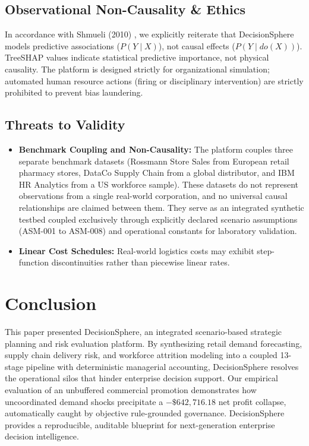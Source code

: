 \documentclass[conference]{IEEEtran}
\begin{document}
\subsection{Observational Non-Causality & Ethics}
In accordance with Shmueli (2010) \cite{shmueli2010explain}, we explicitly reiterate that DecisionSphere models predictive associations ($P(Y \mid X)$), not causal effects ($P(Y \mid do(X))$). TreeSHAP values indicate statistical predictive importance, not physical causality. The platform is designed strictly for organizational simulation; automated human resource actions (firing or disciplinary intervention) are strictly prohibited to prevent bias laundering.

\subsection{Threats to Validity}
\begin{itemize}
    \item \textbf{Benchmark Coupling and Non-Causality:} The platform couples three separate benchmark datasets (Rossmann Store Sales from European retail pharmacy stores, DataCo Supply Chain from a global distributor, and IBM HR Analytics from a US workforce sample). These datasets do not represent observations from a single real-world corporation, and no universal causal relationships are claimed between them. They serve as an integrated synthetic testbed coupled exclusively through explicitly declared scenario assumptions (ASM-001 to ASM-008) and operational constants for laboratory validation.
    \item \textbf{Linear Cost Schedules:} Real-world logistics costs may exhibit step-function discontinuities rather than piecewise linear rates.
\end{itemize}

\section{Conclusion}

This paper presented DecisionSphere, an integrated scenario-based strategic planning and risk evaluation platform. By synthesizing retail demand forecasting, supply chain delivery risk, and workforce attrition modeling into a coupled 13-stage pipeline with deterministic managerial accounting, DecisionSphere resolves the operational silos that hinder enterprise decision support. Our empirical evaluation of an unbuffered commercial promotion demonstrates how uncoordinated demand shocks precipitate a $-\$642,716.18$ net profit collapse, automatically caught by objective rule-grounded governance. DecisionSphere provides a reproducible, auditable blueprint for next-generation enterprise decision intelligence.



\end{document}
